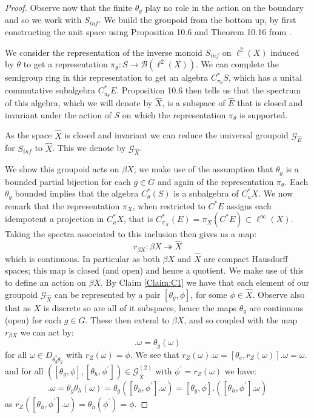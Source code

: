\documentclass[11pt]{amsart}
\theoremstyle{plain}
\theoremstyle{definition}%
\theoremstyle{remark}%
\newcommand{\G}{\mathcal{G}}
\newcommand{\E}{\widehat{E}}
\begin{document}
\begin{proof}
Observe now that the finite $\theta_{g}$ play no role in the action on the boundary and so we work with $S_{inf}$. We build the groupoid from the bottom up, by first constructing the unit space using Proposition 10.6 and Theorem 10.16 from \cite{MR2419901}.

We consider the representation of the inverse monoid $S_{inf}$ on $\ell^{2}(X)$ induced by $\theta$ to get a representation $\pi_{\theta}:S \rightarrow \mathcal{B}(\ell^{2}(X))$. We can complete the semigroup ring in this representation to get an algebra $C^{*}_{\pi_{\theta}}S$, which has a unital commutative subalgebra $C^{*}_{\pi_{\theta}}E$. Proposition 10.6 \cite{MR2419901} then tells us that the spectrum of this algebra, which we will denote by $\widehat{X}$, is a subspace of $\E$ that is closed and invariant under the action of $S$ on which the representation $\pi_{\theta}$ is supported.

As the space $\widehat{X}$ is closed and invariant we can reduce the universal groupoid $\G_{\E}$ for $S_{inf}$ to $\widehat{X}$. This we denote by $\G_{\widehat{X}}$. 

We show this groupoid acts on $\beta X$; we make use of the assumption that $\theta_{g}$ is a bounded partial bijection for each $g \in G$ and again of the representation $\pi_{\theta}$. Each $\theta_{g}$ bounded implies that the algebra $C^{*}_{\theta}(S)$ is a subalgebra of $C^{*}_{u}X$. We now remark that the representation $\pi_{X}$, when restricted to $C^{*}E$ assigns each idempotent a projection in $C^{*}_{u}X$, that is $C^{*}_{\pi_{X}}(E)=\pi_{X}(C^{*}E) \subset \ell^{\infty}(X)$. Taking the spectra associated to this inclusion then gives us a map:
\begin{equation*}
r_{\beta X}: \beta X \twoheadrightarrow \widehat{X}
\end{equation*}
which is continuous. In particular as both $\beta X$ and $\widehat{X}$ are compact Hausdorff spaces; this map is closed (and open) and hence a quotient. We make use of this to define an action on $\beta X$. By Claim \ref{Claim:C1} we have that each element of our groupoid $\G_{\widehat{X}}$ can be represented by a pair $[\theta_{g}, \phi]$, for some $\phi \in \widehat{X}$. Observe also that as $X$ is discrete so are all of it subspaces, hence the maps $\theta_{g}$ are continuous (open) for each $g \in G$. These then extend to $\beta X$, and so coupled with the map $r_{\beta X}$ we can act by:
\begin{equation*}
[\theta_{g},\phi].\omega = \theta_{g}(\omega)
\end{equation*}
for all $\omega \in D_{\theta_{g}^{*}\theta_{g}}$ with $r_{Z}(\omega) = \phi$. We see that $r_{Z}(\omega).\omega= [\theta_{e}, r_{Z}(\omega)].\omega = \omega.$ and for all $([\theta_{g},\phi],[\theta_{h},\phi^{'}]) \in \G_{\widehat{X}}^{(2)}$ with $\phi^{'}=r_{Z}(\omega)$ we have:
\begin{equation*}
[\theta_{g}\theta_{h},\phi^{'}].\omega = \theta_{g}\theta_{h}(\omega) = \theta_{g}([\theta_{h},\phi^{'}].\omega)=[\theta_{g},\phi].([\theta_{h},\phi^{'}].\omega)
\end{equation*}
as $r_{Z}([\theta_{h},\phi^{'}].\omega)=\theta_{h}(\phi^{'})=\phi$.


\end{proof}
\end{document}
